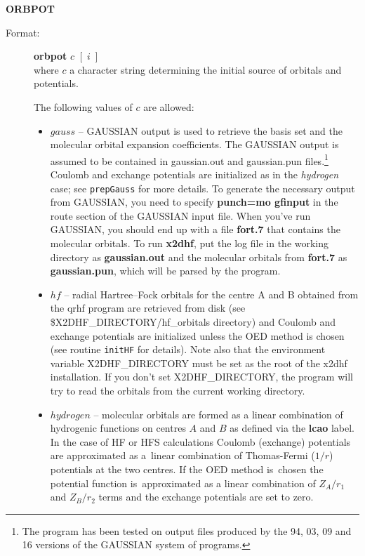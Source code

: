 \documentclass[10pt,a4paper]{article}
\newcommand{\ft}[1]{\texttt{#1}}
\begin{document}
\begin{description}
\item \textbf{ORBPOT}
\begin{description}
\item[Format:] \textbf{orbpot} $c$ $[\; i \;]$\\
  where $c$ a character string determining the initial source of orbitals
  and potentials.

  The following values of $c$ are allowed:
\begin{itemize}

\item $gauss$ -- GAUSSIAN output is used to retrieve the basis set and the
  molecular orbital expansion coefficients. The GAUSSIAN output is assumed
  to be contained in gaussian.out and gaussian.pun files.\footnote{The
    program has been tested on output files produced by the 94, 03, 09 and
    16 versions of the GAUSSIAN system of programs.} Coulomb and exchange
  potentials are initialized as in the \textsl{hydrogen} case; see
  \ft{prepGauss} for more details. To generate the necessary output from
  GAUSSIAN, you need to specify {\bf punch=mo gfinput} in the route section
  of the GAUSSIAN input file. When you've run GAUSSIAN, you should end up
  with a file {\bf fort.7} that contains the molecular orbitals. To run
  {\bf x2dhf}, put the log file in the working directory as {\bf
    gaussian.out} and the molecular orbitals from {\bf fort.7} as {\bf
    gaussian.pun}, which will be parsed by the program.

\item $hf$ -- radial Hartree--Fock orbitals for the centre A and B
  obtained from the qrhf program
  are retrieved from disk (see \$X2DHF\_DI\-REC\-TO\-RY/\-hf\_orbitals
  directory) and Coulomb and exchange potentials are initialized unless the
  OED method is chosen (see routine \ft{initHF} for details).
  Note also that the environment variable
  X2DHF\_DIRECTORY must be set as the root of the x2dhf installation. If
  you don't set X2DHF\_DIRECTORY, the program will try to read the orbitals
  from the current working directory.
  
\item $hydrogen$ -- molecular orbitals are formed as a linear combination
  of hydrogenic functions on centres $A$ and $B$ as defined via the
  \textbf{lcao} label. In the case of HF or HFS calculations Coulomb
  (exchange) potentials are approximated as a~linear combination of
  Thomas-Fermi ($1/r$) potentials at the two centres. If the OED method
  is~chosen the potential function is~approximated as a linear combination
  of $Z_A/r_1$ and $Z_B/r_2$ terms and the exchange potentials are set to
  zero.


\end{itemize}
\end{description}
\end{description}
\end{document}
